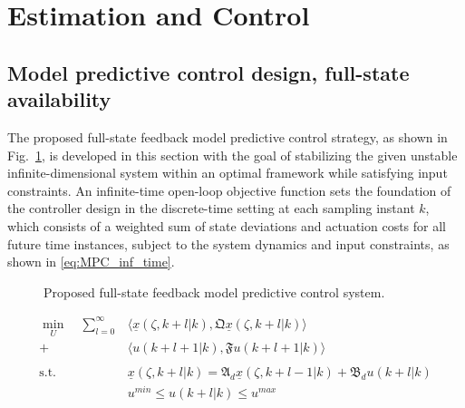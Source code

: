 \section{Estimation and Control}

\subsection{Model predictive control design, full-state availability}

The proposed full-state feedback model predictive control strategy, as shown in Fig.~\ref{fig:block_diagram}, is developed in this section with the goal of stabilizing the given unstable infinite-dimensional system within an optimal framework while satisfying input constraints. An infinite-time open-loop objective function sets the foundation of the controller design in the discrete-time setting at each sampling instant $k$, which consists of a weighted sum of state deviations and actuation costs for all future time instances, subject to the system dynamics and input constraints, as shown in \eqref{eq:MPC_inf_time}.

\begin{figure}[!htbp]
    \centering
    \caption{Proposed full-state feedback model predictive control system.}
    \label{fig:block_diagram}
\end{figure}

\begin{equation} \label{eq:MPC_inf_time}
    \begin{aligned}
        \min_{U} \quad \sum_{l=0}^{\infty} &\langle \underline{x}(\zeta, k+l | k), \mathfrak{Q} \underline{x}(\zeta, k+l | k) \rangle \\
        + &\langle u(k+l+1 | k), \mathfrak{F} u(k+l+1|k) \rangle \\
        \, \\
        \text{s.t.} \quad &\underline{x}(\zeta, k+l | k) = \mathfrak{A}_d \underline{x}(\zeta, k+l-1 | k) + \mathfrak{B}_d u(k+l | k) \\
        &u^{min} \leq u(k+l | k) \leq u^{max}
    \end{aligned}
\end{equation}

